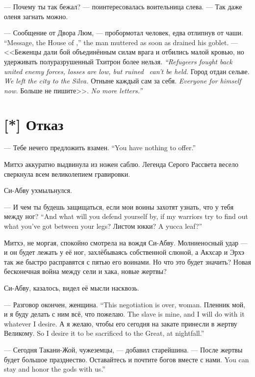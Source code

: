 --- Почему ты так бежал? --- поинтересовалась воительница слева.
--- Так даже оленя загнать можно.

{--- Сообщение от Двора Люм, --- пробормотал человек, едва отлипнув от чаши.}
{``Message, the House of \Loem,'' the man muttered as soon as drained his goblet.}
{--- <<Беженцы дали бой объединённым силам врага и отбились малой кровью, но удерживать полуразрушенный Тхитрон более нельзя.}
{\emph{``Refugeers fought back united enemy forces, losses are low, but ruined \Tchitron\ can't be held.}}
{Город отдан сельве.}
{\emph{We left the city to the Silva.}}
{Отныне каждый сам за себя.}
{\emph{Everyone for himself now.}}
{Больше не пишите>>.}
{\emph{No more letters.''}}

\section{[*] Отказ}

\textspace

{--- Тебе нечего предложить взамен.}
{``You have nothing to offer.''}

Митхэ аккуратно выдвинула из ножен саблю.
Легенда Серого Рассвета весело сверкнула всем великолепием гравировки.

Си-Абву ухмыльнулся.

{--- И чем ты будешь защищаться, если мои воины захотят узнать, что у тебя между ног?}
{``And what will you defend yourself by, if my warriors try to find out what you've got between your legs?}
{Листом юкки?}
{A yucca leaf?''}

Митхэ, не моргая, спокойно смотрела на вождя Си-Абву.
Молниеносный удар --- и он будет лежать у её ног, захлёбываясь собственной слюной, а Акхсар и Эрхэ так же быстро расправятся с пятью его воинами.
Но что это будет значить?
Новая бесконечная война между сели и хака, новые жертвы?

Си-Абву, казалось, видел её мысли насквозь.

{--- Разговор окончен, женщина.}
{``This negotiation is over, woman.}
{Пленник мой, и я буду делать с ним всё, что пожелаю.}
{The slave is mine, and I will do with it whatever I desire.}
{А я желаю, чтобы его сегодня на закате принесли в жертву Великому.}
{So I desire it to be sacrificed to the Great, at nightfall.''}

--- Сегодня Такани-Жой, чужеземцы, --- добавил старейшина.
--- После жертвы будет большое празднество.
{Оставайтесь и почтите богов вместе с нами.}
{You can stay and honor the gods with us.''}

